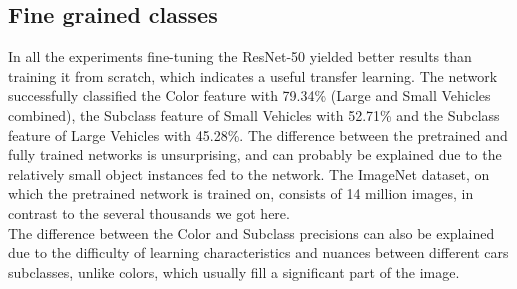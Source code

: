 \documentclass[]{article}
\begin{document}
\subsection{Fine grained classes}
In all the experiments fine-tuning the ResNet-50 \cite{resnet} yielded better results than training it from scratch, which indicates a useful transfer learning.
The network successfully classified the Color feature with 79.34\% (Large and Small Vehicles combined), the Subclass feature of Small Vehicles with 52.71\% and the Subclass feature of Large Vehicles with 45.28\%. The difference between the pretrained and fully trained networks is unsurprising, and can probably be explained due to the relatively small object instances fed to the network. The ImageNet \cite{imagenet} dataset, on which the pretrained network is trained on, consists of 14 million images, in contrast to the several thousands we got here. \\
The difference between the Color and Subclass precisions can also be explained due to the difficulty of learning characteristics and nuances between different cars subclasses, unlike colors, which usually fill a significant part of the image.
\end{document}
